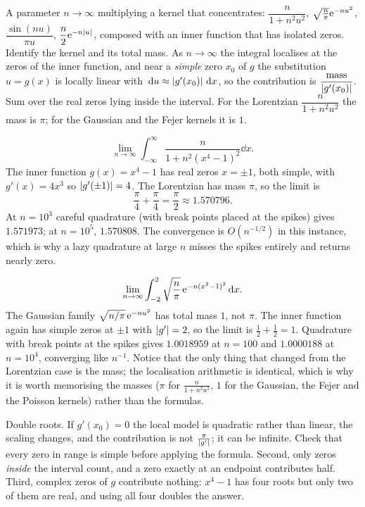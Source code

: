 \cue A parameter $n\to\infty$ multiplying a kernel that concentrates: $\dfrac{n}{1+n^{2}u^{2}}$, $\sqrt{\tfrac{n}{\pi}}\mathrm{e}^{-nu^{2}}$, $\dfrac{\sin(nu)}{\pi u}$, $\dfrac{n}{2}\mathrm{e}^{-n\left\lvert u\right\rvert}$, composed with an inner function that has isolated zeros.
\method Identify the kernel and its total mass. As $n\to\infty$ the integral localises at the zeros of the inner function, and near a \emph{simple} zero $x_{0}$ of $g$ the substitution $u=g(x)$ is locally linear with $\,\mathrm{d} u\approx\left\lvert g'(x_{0})\right\rvert\,\mathrm{d} x$, so the contribution is $\dfrac{\text{mass}}{\left\lvert g'(x_{0})\right\rvert}$. Sum over the real zeros lying inside the interval. For the Lorentzian $\dfrac{n}{1+n^{2}u^{2}}$ the mass is $\pi$; for the Gaussian and the Fejer kernels it is $1$.

\begin{worked}
\[\lim_{n\to\infty}\int_{-\infty}^{\infty}\frac{n}{1+n^{2}(x^{4}-1)^{2}}\dd x.\]
The inner function $g(x)=x^{4}-1$ has real zeros $x=\pm1$, both simple, with $g'(x)=4x^{3}$ so $\left\lvert g'(\pm1)\right\rvert=4$. The Lorentzian has mass $\pi$, so the limit is
\[\frac{\pi}{4}+\frac{\pi}{4}=\frac{\pi}{2}\approx1.570796.\]
At $n=10^{3}$ careful quadrature (with break points placed at the spikes) gives $1.571973$; at $n=10^{5}$, $1.570808$. The convergence is $O(n^{-1/2})$ in this instance, which is why a lazy quadrature at large $n$ misses the spikes entirely and returns nearly zero.
\end{worked}

\begin{worked}
\[\lim_{n\to\infty}\int_{-2}^{2}\sqrt{\frac{n}{\pi}}\,\mathrm{e}^{-n(x^{2}-1)^{2}}\,\mathrm{d} x.\]
The Gaussian family $\sqrt{n/\pi}\,\mathrm{e}^{-nu^{2}}$ has total mass $1$, not $\pi$. The inner function again has simple zeros at $\pm1$ with $\left\lvert g'\right\rvert=2$, so the limit is $\tfrac12+\tfrac12=1$. Quadrature with break points at the spikes gives $1.0018959$ at $n=100$ and $1.0000188$ at $n=10^{4}$, converging like $n^{-1}$. Notice that the only thing that changed from the Lorentzian case is the mass; the localisation arithmetic is identical, which is why it is worth memorising the masses ($\pi$ for $\tfrac{n}{1+n^{2}u^{2}}$, $1$ for the Gaussian, the Fejer and the Poisson kernels) rather than the formulas.
\end{worked}

\begin{trap}
Double roots. If $g'(x_{0})=0$ the local model is quadratic rather than linear, the scaling changes, and the contribution is not $\tfrac{\pi}{\left\lvert g'\right\rvert}$; it can be infinite. Check that every zero in range is simple before applying the formula. Second, only zeros \emph{inside} the interval count, and a zero exactly at an endpoint contributes half. Third, complex zeros of $g$ contribute nothing: $x^{4}-1$ has four roots but only two of them are real, and using all four doubles the answer.
\end{trap}

